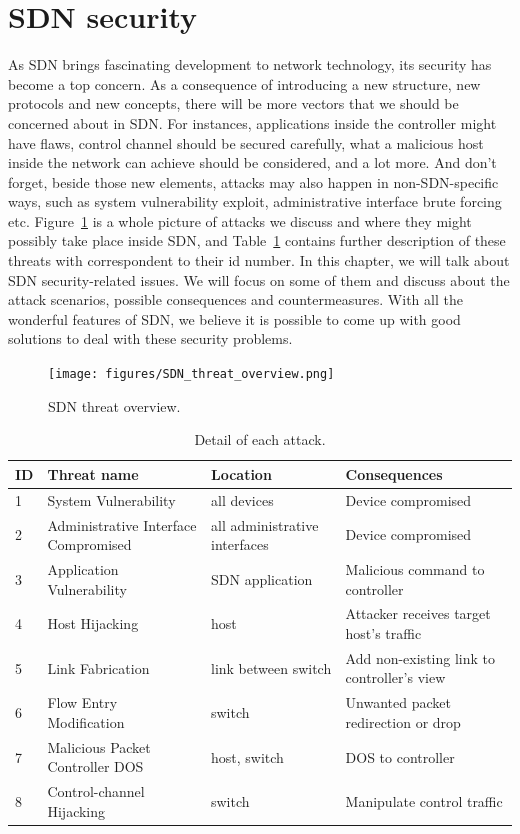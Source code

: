 \section{SDN security}
As SDN brings fascinating development to network technology, its security has become a top concern. As a consequence of introducing a new structure, new protocols and new concepts, there will be more vectors that we should be concerned about in SDN. For instances, applications inside the controller might have flaws, control channel should be secured carefully, what a malicious host inside the network can achieve should be considered, and a lot more. And don't forget, beside those new elements, attacks may also happen in non-SDN-specific ways, such as system vulnerability exploit, administrative interface brute forcing etc. Figure~\ref{SND_threat_overview} is a whole picture of attacks we discuss and where they might possibly take place inside SDN, and Table~\ref{table:sdn_threats} contains further description of these threats with correspondent to their id number. In this chapter, we will talk about SDN security-related issues. We will focus on some of them and discuss about the attack scenarios, possible consequences and countermeasures. With all the wonderful features of SDN, we believe it is possible to come up with good solutions to deal with these security problems.

\begin{figure}[H]
\begin{center} 
\texttt{[image: figures/SDN\_threat\_overview.png]}
\end{center}
\caption{SDN threat overview.}
\label{SND_threat_overview}
\end{figure}

\begin{table}[H]
\centering
\caption{Detail of each attack.}
\begin{tabular}{|l|p{4cm}|p{3.2cm}|p{5cm}|}
\hline ID & Threat name	& Location & Consequences \\
\hline
\hline 1 & System Vulnerability & all devices & Device compromised\\
\hline 2 & Administrative Interface Compromised & all administrative interfaces & Device compromised \\
\hline 3 & Application Vulnerability & SDN application & Malicious command to controller \\
\hline 4 & Host Hijacking & host & Attacker receives target host's traffic \\
\hline 5 & Link Fabrication & link between switch & Add non-existing link to controller's view \\
\hline 6 & Flow Entry Modification & switch & Unwanted packet redirection or drop \\
\hline 7 & Malicious Packet Controller DOS  & host, switch & DOS to controller \\
\hline 8 & Control-channel Hijacking & switch & Manipulate control traffic \\
\hline 
\end{tabular}
\label{table:sdn_threats}
\end{table}

